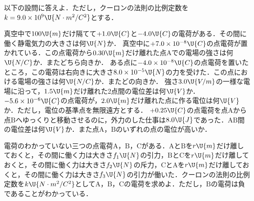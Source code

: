 \newpage

\setcounter{qno}{33}

\filbreak
{}


\hspace{1zw}以下の設問に答えよ．ただし，クーロンの法則の比例定数を$k=9.0\times 10^9\U{N\cdot m^2/C^2}$とする．
\begin{komon}
 真空中で$100\U{m}$だけ隔てて$+1.0\U{C}$と$-4.0\U{C}$の電荷がある．その間に働く静電気力の大きさは何$\U{N}$か．
 真空中に$+7.0\times 10^{-8}\U{C}$の点電荷が置かれている．この点電荷から$0.30\U{m}$だけ離れた点$\mathrm{A}$での電場の強さは何$\U{N/C}$か．またどちら向きか．
 ある点に$-4.0\times 10^{-8}\U{C}$の点電荷を置いたところ，この電荷は右向きに大きさ$8.0\times 10^{-5}\U{N}$の力を受けた．この点における電場の強さは何$\U{N/C}$か．またどの向きか．
 強さ$3.0\U{V/m}$の一様な電場に沿って，$1.5\U{m}$だけ離れた2点間の電位差は何$\U{V}$か．
 $-5.6\times 10^{-6}\U{C}$の点電荷が，$2.0\U{m}$だけ離れた点に作る電位は何$\U{V}$か．ただし，電位の基準点を無限遠方とする．
 $+0.25\U{C}$の点電荷を点$\mathrm{A}$から点$\mathrm{B}$へゆっくりと移動させるのに，外力のした仕事は$8.0\U{J}$であった．$\mathrm{AB}$間の電位差は何$\U{V}$か．また点$\mathrm{A}$，$\mathrm{B}$のいずれの点の電位が高いか．
\end{komon}

\filbreak
{}


\hspace{1zw}電荷のわかっていない三つの点電荷$\mathrm{A}$，$\mathrm{B}$，$\mathrm{C}$がある．$\mathrm{A}$と$\mathrm{B}$を$r\U{m}$だけ離しておくと，その間に働く力は大きさ$f_1\U{N}$の引力，$\mathrm{B}$と$\mathrm{C}$を$r\U{m}$だけ離しておくと，その間に働く力は大きさ$f_2\U{N}$の斥力，$\mathrm{C}$と$\mathrm{A}$を$r\U{m}$だけ離しておくと，その間に働く力は大きさ$f_3\U{N}$の引力が働いた．クーロンの法則の比例定数を$k\U{N\cdot m^2/C^2}$として$\mathrm{A}$，$\mathrm{B}$，$\mathrm{C}$の電荷を求めよ．ただし，$\mathrm{B}$の電荷は負であることがわかっている．


